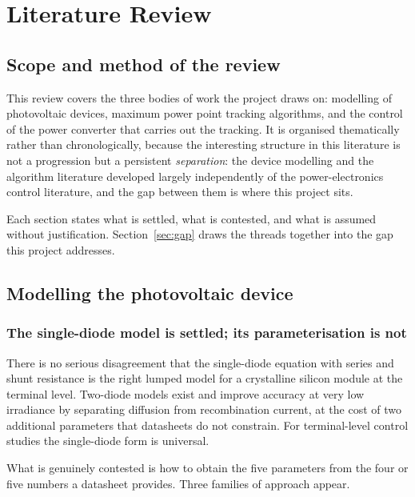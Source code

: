 \chapter{Literature Review}
\label{ch:litreview}

\section{Scope and method of the review}

This review covers the three bodies of work the project draws on: modelling of
photovoltaic devices, maximum power point tracking algorithms, and the control
of the power converter that carries out the tracking. It is organised
thematically rather than chronologically, because the interesting structure in
this literature is not a progression but a persistent \emph{separation}: the
device modelling and the algorithm literature developed largely independently
of the power-electronics control literature, and the gap between them is where
this project sits.

Each section states what is settled, what is contested, and what is assumed
without justification. Section~\ref{sec:gap} draws the threads together into the
gap this project addresses.

\section{Modelling the photovoltaic device}

\subsection{The single-diode model is settled; its parameterisation is not}

There is no serious disagreement that the single-diode equation with series and
shunt resistance is the right lumped model for a crystalline silicon module at
the terminal level. Two-diode models exist and improve accuracy at very low
irradiance by separating diffusion from recombination current, at the cost of
two additional parameters that datasheets do not constrain. For terminal-level
control studies the single-diode form is universal.

What is genuinely contested is how to obtain the five parameters from the four
or five numbers a datasheet provides. Three families of approach appear.

